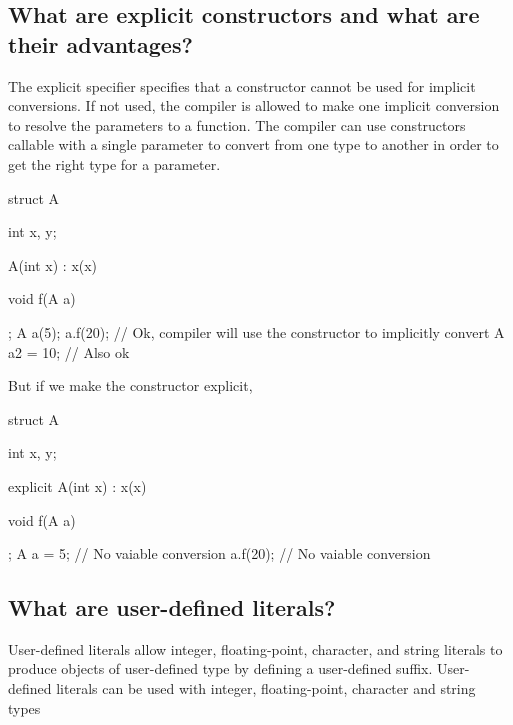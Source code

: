 \documentclass{report}
\begin{document}
\subsection{What are explicit constructors and what are their advantages?}
\bigbreak \noindent 
The explicit specifier specifies that a constructor cannot be used for implicit conversions.
\bigbreak \noindent 
If not used, the compiler is allowed to make one implicit conversion
to resolve the parameters to a function. The compiler can use
constructors callable with a single parameter to convert from one
type to another in order to get the right type for a parameter.
\bigbreak \noindent 
\begin{cppcode}
    struct A {
        int x{}, y{};

        A(int x) : x(x) {}

        void f(A a) {}
    };
    A a(5);
    a.f(20); // Ok, compiler will use the constructor to implicitly convert
    A a2 = 10; // Also ok
\end{cppcode}
\bigbreak \noindent 
But if we make the constructor explicit,
\bigbreak \noindent 
\begin{cppcode}
    struct A {
        int x{}, y{};

        explicit A(int x) : x(x) {}

        void f(A a) {}
    };
    A a = 5; // No vaiable conversion
    a.f(20); // No vaiable conversion
\end{cppcode}

\bigbreak \noindent 
\subsection{What are user-defined literals?}
\bigbreak \noindent 
User-defined literals allow integer, floating-point, character, and string literals to produce objects of user-defined type by defining a user-defined suffix.
\bigbreak \noindent 
User-defined literals can be used with integer, floating-point, character and string types
\bigbreak \noindent 

\bigbreak \noindent 
\end{document}
